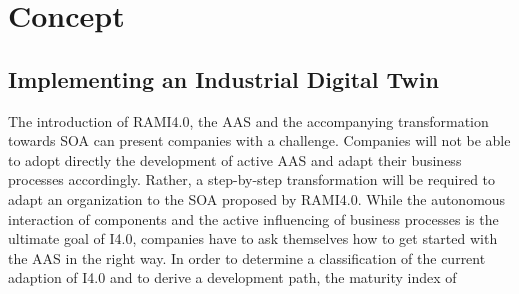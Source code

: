 \chapter{Concept}
\section{Implementing an Industrial Digital Twin}

The introduction of \ac{RAMI4.0}, the \ac{AAS} and the accompanying transformation towards \ac{SOA} can present companies with a challenge. Companies will not be able to adopt directly the development of active \ac{AAS} and adapt their business processes accordingly. Rather, a step-by-step transformation will be required to adapt an organization to the \ac{SOA} proposed by \ac{RAMI4.0}. While the autonomous interaction of components and the active influencing of business processes is the ultimate goal of \ac{I4.0}, companies have to ask themselves how to get started with the \ac{AAS} in the right way. In order to determine a classification of the current adaption of \ac{I4.0} and to derive a development path, the maturity index of 
